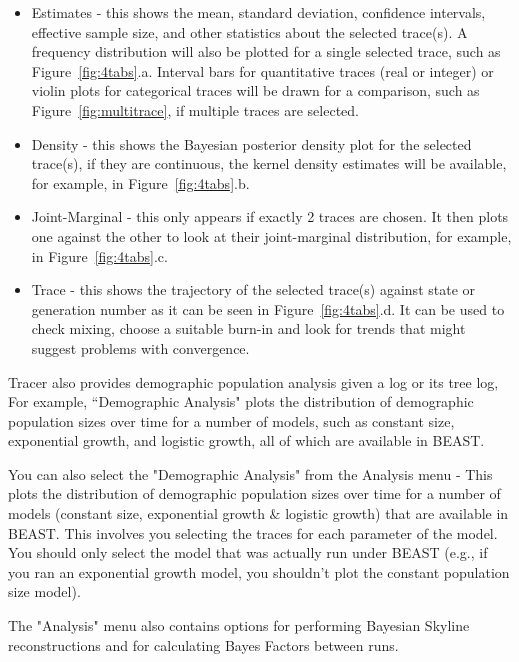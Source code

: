 \documentclass{bioinfo}
\begin{document}
\begin{itemize}
\item Estimates - this shows the mean, standard deviation, confidence intervals, effective sample size, and other statistics about the selected trace(s). A frequency distribution will also be plotted for a single selected trace, such as Figure~\ref{fig:4tabs}.a. Interval bars for quantitative traces (real or integer) or violin plots for categorical traces will be drawn for a comparison, such as Figure~\ref{fig:multitrace}, if multiple traces are selected.

\item Density - this shows the Bayesian posterior density plot for the selected trace(s), if they are continuous, the kernel density estimates will be available, for example, in Figure~\ref{fig:4tabs}.b.

\item Joint-Marginal - this only appears if exactly 2 traces are chosen. It then plots one against the other to look at their joint-marginal distribution, for example, in Figure~\ref{fig:4tabs}.c.

\item Trace - this shows the trajectory of the selected trace(s) against state or generation number as it can be seen in Figure~\ref{fig:4tabs}.d. It can be used to check mixing, choose a suitable burn-in and look for trends that might suggest problems with convergence.

\end{itemize}

Tracer also provides demographic population analysis given a log or its tree log,
For example, ``Demographic Analysis" plots the distribution of demographic population sizes over time for a number of models, such as constant size, exponential growth, and logistic growth, all of which are available in BEAST. 




You can also select the "Demographic Analysis" from the Analysis menu - This plots the distribution of demographic population sizes over time for a number of models (constant size, exponential growth \& logistic growth) that are available in BEAST. This involves you selecting the traces for each parameter of the model. You should only select the model that was actually run under BEAST (e.g., if you ran an exponential growth model, you shouldn't plot the constant population size model).

The "Analysis" menu also contains options for performing Bayesian Skyline reconstructions and for calculating Bayes Factors between runs.
\end{document}
